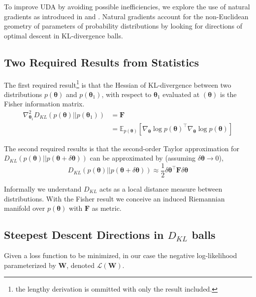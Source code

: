 \documentclass[10pt,twocolumn,letterpaper]{article}
\newcommand{\vect}[1]{\boldsymbol{\mathbf{#1}}}
\begin{document}

To improve UDA by avoiding possible inefficiencies, we explore the use of natural gradients as introduced in \cite{amari1998natural} and \cite{pascanu2013revisiting}. 
Natural gradients account for the non-Euclidean geometry of parameters of probability distributions by looking for directions of optimal descent in KL-divergence balls. 

\subsection{Two Required Results from Statistics}
The first required result\footnote{the lengthy derivation is ommitted with only the result included.} is that the Hessian of KL-divergence between two distributions \(p(\vect{\theta})\) and \(p(\vect{\theta}_1)\), with respect to \(\vect{\theta}_1\) evaluated at \((\vect{\theta})\) is the Fisher information matrix. 
\begin{align*}
    \nabla_{\vect{\theta}_1}^2 D_{KL}(p(\vect{\theta})|| p(\vect{\theta}_1)) &= \vect{F} \\
    &= \mathbb{E}_{p(\vect{\theta})} [\nabla_{\vect{\theta}} \log p(\vect{\theta})^{\intercal} \nabla_{\vect{\theta}} \log p(\vect{\theta})]
\end{align*}

The second required results is that the second-order Taylor approximation for \(D_{KL}(p(\vect{\theta})|| p(\vect{\theta}+\delta \vect{\theta} ))\) can be approximated by (assuming \(\delta \vect{\theta} \to 0\)),
\begin{equation} \label{eq:KL-tsapprox}
D_{KL}(p(\vect{\theta})|| p(\vect{\theta}+\delta \vect{\theta} )) \approx \frac{1}{2}\delta \vect{\theta}^{\intercal}\vect{F}\delta \vect{\theta}
\end{equation}

Informally we understand \(D_{KL}\) acts as a local distance measure between distributions.
With the Fisher result we conceive an induced Riemannian manifold over \(p(\vect{\theta})\) with \(\vect{F}\) as metric.

\subsection{Steepest Descent Directions in \(D_{KL}\) balls}
Given a loss function to be minimized, in our case the negative log-likelihood parameterized by \(\vect{W}\), denoted \(\mathcal{L}(\vect{W})\).
\end{document}

